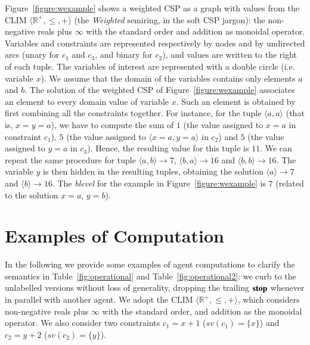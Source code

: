 \documentclass[main.tex]{subfiles}
\begin{document}
\begin{example}
\label{ex1}
Figure~\ref{figure:wexample}
shows a weighted CSP as a graph with values from
the CLIM $\langle \mathbb{R}^{+}, \leq, +\rangle$ (the \emph{Weighted} semiring, in the soft CSP jargon):
the non-negative reals plus $\infty$ with the standard order and addition as monoidal operator.
%
Variables and constraints are represented respectively by nodes
and by undirected arcs (unary for $c_1$ and $c_3$, and binary for
$c_2$), and values are written to the right of each
tuple. The variables of interest are
represented with a double circle (i.e. variable $x$). We
assume that the domain of the variables contains only elements $a$
and $b$. The solution of the weighted CSP of
Figure~\ref{figure:wexample} associates an element to every
domain value of variable $x$. Such an element is obtained by first
combining all the constraints together. For instance, for the
tuple $\langle a, a\rangle$ (that is, $x = y = a$), we have to
compute the sum of $1$ (the value assigned to $x = a$ in
constraint $c_1$), $5$ (the value assigned to $\langle x
= a, y = a \rangle$ in $c_2$) and $5$ (the value assigned to $y =
a$ in $c_3$). Hence, the resulting value for this tuple is $11$.
We can repeat the same procedure for tuple $\langle a, b\rangle \rightarrow
7$, $\langle b, a\rangle \rightarrow 16$ and $\langle b, b\rangle
\rightarrow 16$. The variable $y$ is then hidden in the resulting tuples,
obtaining the solution $\langle a \rangle \rightarrow
7$ and $\langle b \rangle \rightarrow 16$. The \emph{blevel} for
the example in Figure~\ref{figure:wexample} is $7$ (related to the
solution $x = a$, $y = b$).
\end{example}

\section{Examples of Computation}\label{sec:examples}
In the following we provide some examples of agent computations to clarify the  semantics in Table~\ref{fig:operational} and Table~\ref{fig:operational2}: we curb to the unlabelled versions without loss of generality, dropping the trailing $\mbox{{\bf stop}}$ whenever in parallel with another agent. 
%
We adopt the CLIM $\langle \mathbb{R}^{+}, \leq, +\rangle$, which considers  non-negative reals plus $\infty$ with the standard order, and addition as the monoidal operator. We also consider two constraints $c_1 = x+1$ ($\mathit{sv}(c_1)= \{x\}$) and $c_2= y+2$ ($\mathit{sv}(c_2)= \{y\}$). 
\end{document}
